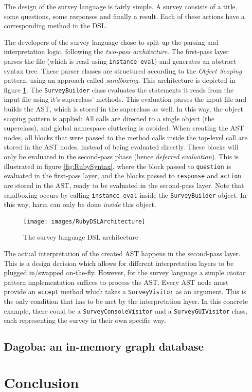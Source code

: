 The design of the survey language is fairly simple. A survey consists of a title, some questions, some responses and finally a result. Each of these actions have a corresponding method in the DSL.

The developers of the survey language chose to split up the parsing and interpretation logic, following the \textit{two-pass architecture}.
The first-pass layer parses the file (which is read using \texttt{instance\_eval}) and generates an abstract syntax tree. These parser classes are structured according to the \textit{Object Scoping} pattern\cite{DSLFowler}, using an approach called \textit{sandboxing}. This architecture is depicted in figure \ref{fig:RubyDSLArchitecture}. The \texttt{SurveyBuilder} class evaluates the statements it reads from the input file using it's superclass' methods. This evaluation parses the input file and builds the AST, which is stored in the superclass as well. In this way, the object scoping pattern is applied: All calls are directed to a single object (the superclass), and global namespace cluttering is avoided. When creating the AST nodes, all blocks that were passed to the method calls inside the top-level call are stored in the AST nodes, instead of being evaluated directly. These blocks will only be evaluated in the second-pass phase (hence \textit{deferred evaluation}). This is illustrated in figure \ref{fig:RubySyntax}, where the block passed to \texttt{question} is evaluated in the first-pass layer, and the blocks passed to \texttt{response} and \texttt{action} are stored in the AST, ready to be evaluated in the second-pass layer.
Note that sandboxing occurs by calling \texttt{instance\_eval} inside the \texttt{SurveyBuilder} object. In this way, harm can only be done \textit{inside} this object. 

\begin{figure}[!ht]
  	\centering
    	\texttt{[image: images/RubyDSLArchitecture]} 
    	\caption{The survey language DSL architecture}
    \label{fig:RubyDSLArchitecture}
\end{figure}

The actual interpretation of the created AST happens in the second-pass layer. This is a design decision which allows for different interpretation layers to be plugged in/swapped on-the-fly. However, for the survey language a simple \textit{visitor} pattern implementation suffices to process the AST. Every AST node must provide an \texttt{accept} method which takes a \texttt{SurveyVisitor} as an argument. This is the only condition that has to be met by the interpretation layer. In this concrete example, there could be a \texttt{SurveyConsoleVisitor} and a \texttt{SurveyGUIVisitor} class, each representing the survey in their own specific way.



\subsection{Dagoba: an in-memory graph database}

\section{Conclusion}